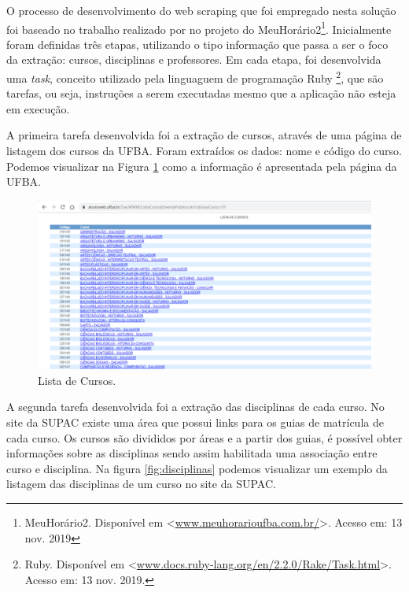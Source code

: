 \documentclass[12pt, a4paper]{report}
\begin{document}
O processo de desenvolvimento do web scraping que foi empregado nesta solução foi baseado no trabalho realizado por \citeauthor{assis2017meuhorario} no projeto do MeuHorário2\footnote{MeuHorário2. Disponível em <\url{www.meuhorarioufba.com.br/}>. Acesso em: 13 nov. 2019}. Inicialmente foram definidas três etapas, utilizando o tipo informação que passa a ser o foco da extração: cursos, disciplinas e professores.  Em cada etapa, foi desenvolvida uma \textit{task}, conceito utilizado pela linguaguem de programação Ruby \footnote{Ruby. Disponível em <\url{www.docs.ruby-lang.org/en/2.2.0/Rake/Task.html}>. Acesso em: 13 nov. 2019.}, que são tarefas, ou seja, instruções a serem executadas mesmo que a aplicação não esteja em execução. 

A primeira tarefa desenvolvida foi a extração de cursos, através de uma página de listagem dos cursos da UFBA. Foram extraídos os dados: nome e código do curso. Podemos visualizar na Figura \ref{fig:lista_cursos} como a informação é apresentada pela página da UFBA.

\begin{figure}
\centering
\includegraphics[scale=0.9]{lista_cursos.png}
\caption{Lista de Cursos.}
\label{fig:lista_cursos}
\end{figure}

A segunda tarefa desenvolvida foi a extração das disciplinas de cada curso. No site da \ac{SUPAC} existe uma área que possui links para os guias de matrícula de cada curso. Os cursos são divididos por áreas e a partir dos guias, é possível obter informações sobre as disciplinas sendo assim habilitada uma associação entre curso e disciplina. Na figura \ref{fig:disciplinas} podemos visualizar um exemplo da listagem das disciplinas de um curso no site da SUPAC.
\end{document}
